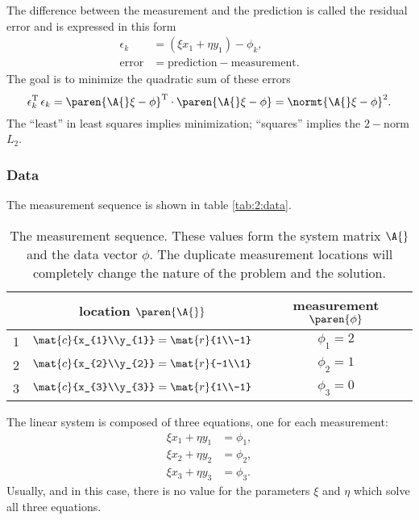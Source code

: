 The difference between the measurement and the prediction is called the residual error and is expressed in this form
\begin{equation}
  \begin{split}
    \epsilon_{k} &= (\xi x_{1} + \eta y_{1}) - \phi_{k},\\
    \text{error} &= \text{prediction} - \text{measurement}.
  \end{split}
\end{equation}
The goal is to minimize the quadratic sum of these errors
\begin{equation}
  \epsilon_{k}^{\mathrm{T}}\,\epsilon_{k} = \paren{\A{}\xi - \phi}^{\mathrm{T}}\cdot\paren{\A{}\xi - \phi} = \normt{\A{}\xi - \phi}^{2}.
\end{equation}
The ``least'' in least squares implies minimization; ``squares'' implies the $2-$norm $L_{2}$.

\subsubsection{Data}
The measurement sequence is shown in table \eqref{tab:2:data}.
\begin{table}[h]
\begin{center}
\begin{tabular}{ccc}
    & location $\paren{\A{}}$ & measurement $\paren{\phi}$ \\ \hline
  1 & $\mat{c}{x_{1}\\y_{1}}=\mat{r}{1\\-1}$ & $\phi_{1}=2$ \\[13pt]
  2 & $\mat{c}{x_{2}\\y_{2}}=\mat{r}{-1\\1}$ & $\phi_{2}=1$ \\[13pt]
  3 & $\mat{c}{x_{3}\\y_{3}}=\mat{r}{1\\-1}$ & $\phi_{3}=0$ \\[13pt]
\end{tabular}
\end{center}
\caption[The measurement sequence]{The measurement sequence. These values form the system matrix $\A{}$ and the data vector $\phi$. The duplicate measurement locations will completely change the nature of the problem and the solution.}
\label{tab:2:data}
\end{table}%
The linear system is composed of three equations, one for each measurement:
\begin{equation}
  \begin{split}
    \xi x_{1} + \eta y_{1} &= \phi_{1}, \\
    \xi x_{2} + \eta y_{2} &= \phi_{2}, \\
    \xi x_{3} + \eta y_{3} &= \phi_{3}.
  \end{split}
\end{equation}
Usually, and in this case, there is no value for the parameters $\xi$ and $\eta$ which solve all three equations. 

